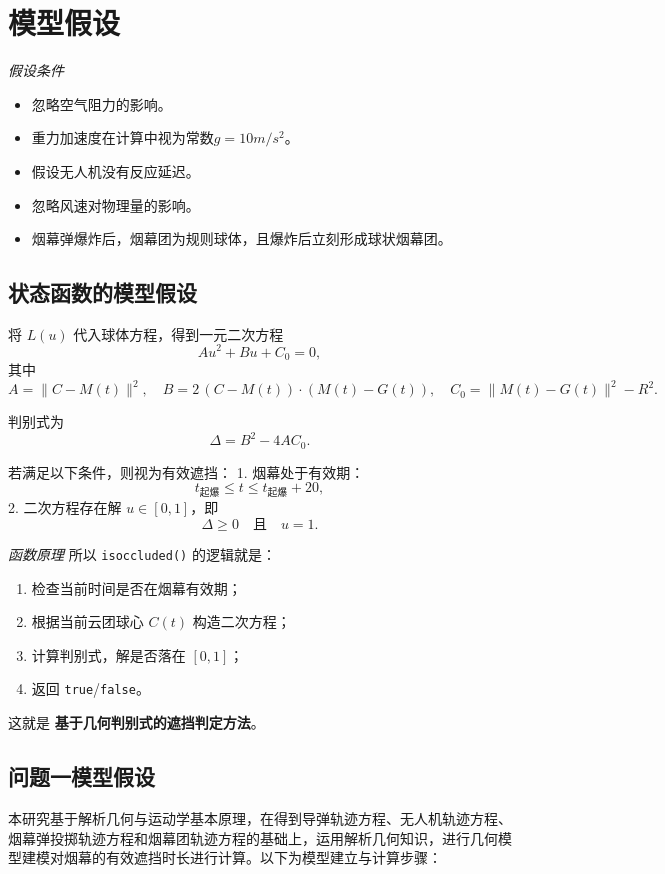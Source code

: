 \documentclass{article}
\begin{document}
\section{模型假设}

\textit{假设条件}
\begin{itemize}
    \item 忽略空气阻力的影响。
    \item 重力加速度在计算中视为常数$g = 10m/s^2$。
    \item 假设无人机没有反应延迟。
    \item 忽略风速对物理量的影响。
    \item 烟幕弹爆炸后，烟幕团为规则球体，且爆炸后立刻形成球状烟幕团。
\end{itemize}
\subsection{状态函数的模型假设}
将 $L(u)$ 代入球体方程，得到一元二次方程
\[
A u^2 + B u + C_0 = 0,
\]
其中
\[
A = \|C - M(t)\|^2, \quad
B = 2\,(C - M(t)) \cdot (M(t) - G(t)), \quad
C_0 = \|M(t) - G(t)\|^2 - R^2.
\]

判别式为
\[
\Delta = B^2 - 4AC_0.
\]

若满足以下条件，则视为有效遮挡：
1. 烟幕处于有效期：
\[
t_{\text{起爆}} \leq t \leq t_{\text{起爆}} + 20,
\]
2. 二次方程存在解 $u \in [0,1]$，即
\[
\Delta \geq 0 \quad \text{且} \quad u = 1.
\]

\textit{函数原理}
所以 \texttt{isoccluded()} 的逻辑就是：

\begin{enumerate}[leftmargin=*,label=\arabic*.]
  \item 检查当前时间是否在烟幕有效期；
  \item 根据当前云团球心 \(C(t)\) 构造二次方程；
  \item 计算判别式，解是否落在 \([0,1]\)；
  \item 返回 \texttt{true}/\texttt{false}。
\end{enumerate}

这就是 \textbf{基于几何判别式的遮挡判定方法}。

\subsection{问题一模型假设}





本研究基于解析几何与运动学基本原理，在得到导弹轨迹方程、无人机轨迹方程、烟幕弹投掷轨迹方程和烟幕团轨迹方程的基础上，运用解析几何知识，进行几何模型建模对烟幕的有效遮挡时长进行计算。以下为模型建立与计算步骤：
\end{document}
